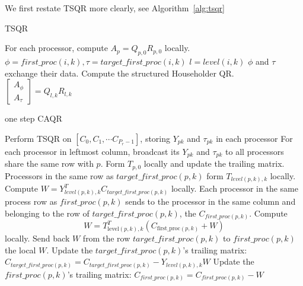 \documentclass{article}
\begin{document}
We first restate TSQR more clearly, see Algorithm~\ref{alg:tsqr}
\begin{algorithm}[htbp]
	\caption{TSQR}
	\label{alg:tsqr}
	\begin{algorithmic}[1]
		\STATE For each processor, compute $A_p = Q_{p,0}R_{p,0}$ locally.
		\STATE $\phi = first\_proc(i,k), \tau =  target\_first\_proc(i,k)$
		\ELSE
		\STATE \Continue
		\ENDIF
		\STATE $l = level(i,k)$
		\STATE $\phi$ and $\tau$ exchange their data.
		\STATE Compute the structured Householder QR. $\begin{bmatrix}
		A_{\phi} \\ A_{\tau}
		\end{bmatrix} = Q_{l,k}R_{l,k}$
		\ENDFOR
	\end{algorithmic}
\end{algorithm}

\begin{algorithm}[htbp]
	\caption{one step CAQR}
	\label{alg:caqr}
	\begin{algorithmic}[1]
		\STATE Perform TSQR on $[C_{0}, C_{1}, \cdots C_{P_r-1}]$, storing $Y_{pk}$ and $\tau_{pk}$ in each processor 
		\STATE For each processor in leftmost column, broadcast its $Y_{pk}$ and $\tau_{pk}$ to all processors share the same row with $p$. 
		\STATE Form $T_{p,0}$ locally and update the trailing matrix.
			\STATE Processors in the same row as $target\_first\_proc(p,k)$ form $T_{level(p,k),k}$ locally. Compute $W = Y^T_{level(p,k),k}C_{target\_first\_proc(p,k)}$ locally.
			\STATE Each processor in the same process row as $first\_proc(p,k)$ sends to the processor in the same column and belonging to the row of $target\_first\_proc(p,k)$, the $C_{first\_proc(p,k)}$.
			\STATE Compute \begin{equation}W=T_{\text {level}(p, k), k}^{T}\left(C_{\text {first\_ {proc}}(p, k)}+W\right)\end{equation} locally.
			\STATE Send back $W$ from the row $target\_first\_proc(p,k)$ to $first\_proc(p,k)$ the local $W$.
			\STATE Update the $target\_first\_proc(p,k)$'s trailing matrix: $C_{target\_first\_proc(p,k)} = C_{target\_first\_proc(p,k)} - Y_{level(p,k),k}W$
			\STATE Update the $first\_proc(p,k)$'s trailing matrix: $C_{first\_proc(p,k)} = C_{first\_proc(p,k)} - W$
			
			\ENDIF
		\ENDFOR
	\end{algorithmic}
\end{algorithm}
\end{document}
